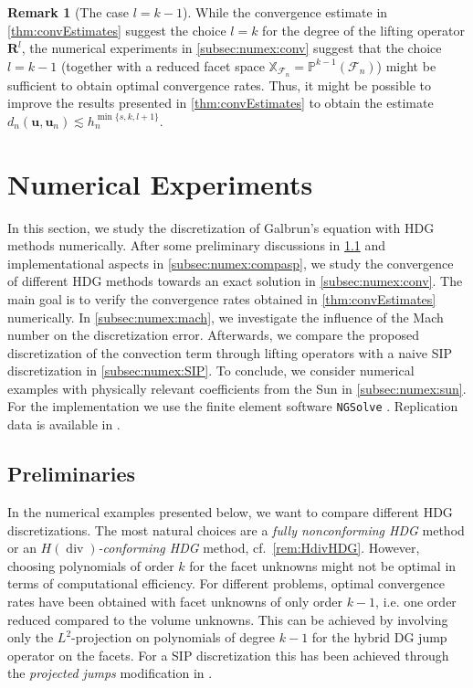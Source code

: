 \documentclass{m2an}
\renewcommand{\u}{\mathbf{u}}
\renewcommand{\div}{\operatorname{div}}
\newcommand{\X}{\mathbb{X}}
\newcommand{\XF}{\X_{\mathcal{F}_n}}
\newcommand{\bRl}{\mathbf{R}^{\!l}}
\newcommand{\Fn}{\mathcal{F}_n}
\theoremstyle{plain}
\theoremstyle{definition}
\newtheorem{remark}[theorem]{Remark}
\begin{document}
\begin{remark}[The case $l = k-1$]\label{rem:CA:improvement}
   While the convergence estimate in \cref{thm:convEstimates} suggest the choice $l = k$ for the degree of the lifting operator $\bRl$, the numerical experiments in \cref{subsec:numex:conv} suggest that the choice $l = k-1$ (together with a reduced facet space $\XF = \mathbb{P}^{k-1}(\Fn)$) might be sufficient to obtain optimal convergence rates. Thus, it might be possible to improve the results presented in \cref{thm:convEstimates} to obtain the estimate $d_n(\u,\u_n) \lesssim h_n^{\min\{s,k,l+1\}}$. 
\end{remark}


\section{Numerical Experiments}\label{sec:numerics}
In this section, we study the discretization of Galbrun's equation with HDG methods numerically. After some preliminary discussions in \cref{subsec:numex:prelim} and implementational aspects in \cref{subsec:numex:compasp}, we study the convergence of different HDG methods towards an exact solution in \cref{subsec:numex:conv}. The main goal is to verify the convergence rates obtained in \cref{thm:convEstimates} numerically. In \cref{subsec:numex:mach}, we investigate the influence of the Mach number on the discretization error. Afterwards, we compare the proposed discretization of the convection term through lifting operators with a naive SIP discretization in \cref{subsec:numex:SIP}. To conclude, we consider numerical examples with physically relevant coefficients from the Sun in \cref{subsec:numex:sun}. For the implementation we use the finite element software \texttt{NGSolve} \cite{Sch97,Sch14}. Replication data is available in \cite{HLvB25}.

\subsection{Preliminaries}\label{subsec:numex:prelim}
In the numerical examples presented below, we want to compare different HDG discretizations. The most natural choices are a \emph{fully nonconforming HDG} method or an \emph{$H(\div)$-conforming HDG} method, cf.~\cref{rem:HdivHDG}. 
%
However, choosing polynomials of order $k$ for the facet unknowns might not be optimal in terms of computational efficiency. 
For different problems, optimal convergence rates have been obtained with facet unknowns of only order $k-1$, i.e. one order reduced compared to the volume unknowns. 
This can be achieved by involving only the $L^2$-projection on polynomials of degree $k-1$ for the hybrid DG jump operator on the facets. For a SIP discretization this has been achieved through the \emph{projected jumps} modification in \cite{LS16}. 
\end{document}
